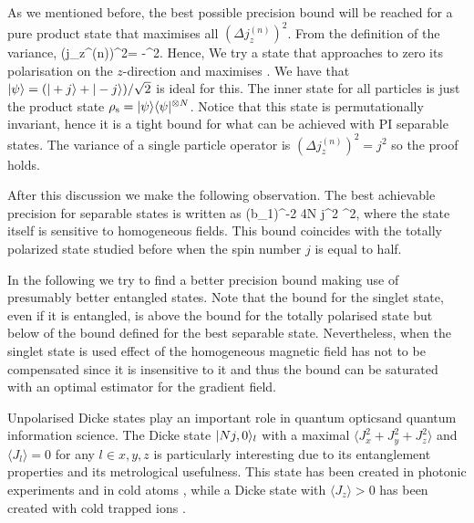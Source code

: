 As we mentioned before, the best possible precision bound will be reached for a pure product state that maximises all $(\Delta j_z^{(n)})^2$.
From the definition of the variance,
\be
(\Delta j_z^{(n)})^2=
-^2.
\ee
Hence, We try a state that approaches to zero its polarisation on the $z$-direction and maximises .
We have that  $\vert \psi \rangle=(\vert +j \rangle+\vert -j \rangle)/\sqrt{2}$ is ideal for this.
The inner state for all particles is just the product state $\rho_{\rm s} =\vert \psi \rangle\langle \psi \vert^{\otimes N}$.
Notice that this state is permutationally invariant, hence it is a tight bound for what can be achieved with PI separable states.
The variance of a single particle operator is $(\Delta j_z^{(n)})^2=j^2$ so the proof holds.

After this discussion we make the following observation. The best achievable precision for separable states is written as
\be
(\Delta b_1)^{-2} \leq 4N j^2 \sigma^2,
\label{eq:best_separable}
\ee
where the state itself is sensitive to homogeneous fields.
This bound coincides with the totally polarized state studied before when the spin number $j$ is equal to half.
\label{obs:precision bound for separable states}

In the following we try to find a better precision bound making use of presumably better entangled states.
Note that the bound for the singlet state, even if it is entangled, is above the bound for the totally polarised state but below of the bound defined for the best separable state.
Nevertheless, when the singlet state is used effect of the homogeneous magnetic field has not to be compensated since it is insensitive to it and thus the bound can be saturated with an optimal estimator for the gradient field.


Unpolarised Dicke states play an important role in quantum opticsand quantum information science.
The Dicke state $\vert Nj,0 \rangle_l$ with a maximal $\langle J_x^2+J_y^2+J_z^2 \rangle$ and $\langle J_l\rangle=0$ for any $l\in x,y,z$ is particularly interesting due to its entanglement properties and its metrological usefulness.
This state has been created in photonic experiments \citep{Kiesel2007,Wieczorek2009,Chiuri2012} and in cold atoms \citep{Luecke2011,Hamley2012}, while a Dicke state with $\langle J_z\rangle>0$ has been created with cold trapped ions \citep{haeffner2005}.

